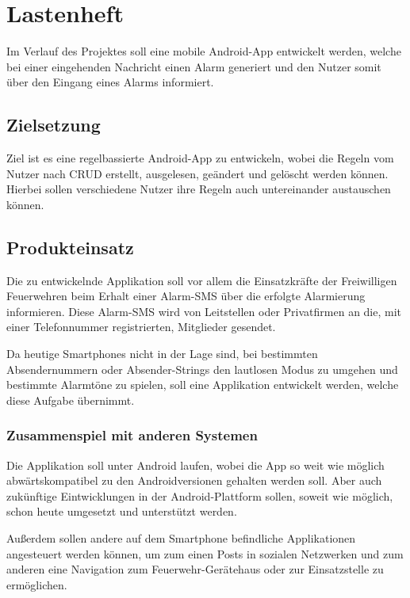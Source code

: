 \section{Lastenheft}
Im Verlauf des Projektes soll eine mobile Android-App entwickelt werden, welche bei einer eingehenden Nachricht einen Alarm generiert und den Nutzer somit \"uber den Eingang eines Alarms informiert.

\subsection{Zielsetzung}
Ziel ist es eine regelbassierte Android-App zu entwickeln, wobei die Regeln vom Nutzer nach CRUD erstellt, ausgelesen, ge\"andert und gel\"oscht werden k\"onnen. Hierbei sollen verschiedene Nutzer ihre Regeln auch untereinander austauschen k\"onnen.

\subsection{Produkteinsatz}
Die zu entwickelnde Applikation soll vor allem die Einsatzkr\"afte der Freiwilligen Feuerwehren beim Erhalt einer Alarm-SMS \"uber die erfolgte Alarmierung informieren. Diese Alarm-SMS wird von Leitstellen oder Privatfirmen an die, mit einer Telefonnummer registrierten, Mitglieder gesendet.

Da heutige Smartphones nicht in der Lage sind, bei bestimmten Absendernummern oder Absender-Strings den lautlosen Modus zu umgehen und bestimmte Alarmt\"one zu spielen, soll eine Applikation entwickelt werden, welche diese Aufgabe \"ubernimmt.

\subsubsection{Zusammenspiel mit anderen Systemen}
Die Applikation soll unter Android laufen, wobei die App so weit wie m\"oglich abw\"artskompatibel zu den Androidversionen gehalten werden soll. Aber auch zuk\"unftige Eintwicklungen in der Android-Plattform sollen, soweit wie m\"oglich, schon heute umgesetzt und unterst\"utzt werden.

Au\ss{}erdem sollen andere auf dem Smartphone befindliche Applikationen angesteuert werden k\"onnen, um zum einen Posts in sozialen Netzwerken und zum anderen eine Navigation zum Feuerwehr-Ger\"atehaus oder zur Einsatzstelle zu erm\"oglichen.

